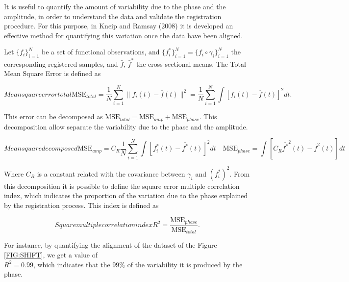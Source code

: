 It is useful to quantify the amount of variability due to the phase and the
amplitude, in order to understand the data and validate the registration
procedure. For this purpose, in Kneip and Ramsay (2008)
\cite{RamsayAlois2008} it is developed an effective method for quantifying
this variation once the data have been aligned.

Let $\{f_i\}_{i=1}^N$ be a set of functional observations, and
$\{f^*_i\}_{i=1}^N = \{f_i \circ \gamma_i\}_{i=1}^N$ the corresponding registered
samples, and $\bar f$, $\bar f^*$ the
cross-sectional means. The Total Mean Square Error is defined as

\begin{equation}[]{Mean square error total}
\text{MSE}_{total}=  \frac{1}{N}\sum_{i=1}^{N} \|f_i(t)-\overline f(t)\|^2 =
\frac{1}{N}\sum_{i=1}^{N}\int[f_i(t)-\overline f(t)]^2dt .
\end{equation}

This error can be decomposed as
$\text{MSE}_{total} = \text{MSE}_{amp} + \text{MSE}_{phase}$. This decomposition allow separate
the variability due to the phase and the amplitude.

\begin{equation}[]{Mean square decomposed}
\text{MSE}_{amp} =  C_R \frac{1}{N}
        \sum_{i=1}^{N} \int \left [ f^*_i(t) - \overline{f^*}(t) \right ]^2 dt \quad
\text{MSE}_{phase}=
        \int \left [C_R \overline{f^*}^2(t) - \overline{f}^2(t) \right]dt
\end{equation}


Where $C_R$ is a constant related with the covariance between $\dot \gamma_i$
and $(f_i^*)^2$.
From this decomposition it is possible to define the
square error multiple correlation index, which indicates the proportion of the
variation due to the phase
explained by the registration process. This index is defined as

\begin{equation}[]{Square multiple correlation index}
R^2 = \frac{\text{MSE}_{phase}}{\text{MSE}_{total}}.
\end{equation}

For instance, by quantifying the alignment of the dataset of the Figure
\ref{FIG:SHIFT}, we get a value of \\ $R^2=0.99$, which indicates that the $99\%$ of
the variability it is produced by the phase.
